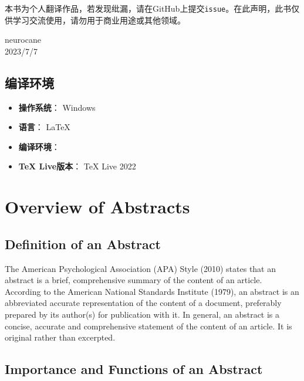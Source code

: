 \documentclass{ctexbook}
\begin{document}
本书为个人翻译作品，若发现纰漏，请在GitHub上提交\verb|issue|。在此声明，此书仅供学习交流使用，请勿用于商业用途或其他领域。

\vfill

\begin{flushright}
    neurocane\\
    2023/7/7
\end{flushright}

\newpage

\section*{编译环境}

\begin{itemize}
    \item \textbf{操作系统}： Windows
    \item \textbf{语言}： \LaTeX
    \item \textbf{编译环境}： \XeLaTeX
    \item \textbf{TeX Live版本}： TeX Live 2022
\end{itemize}

\tableofcontents

\mainmatter


\chapter{Overview of Abstracts}
\section{Definition of an Abstract}

The American Psychological Association (APA) Style (2010) states that an abstract is a brief, comprehensive summary of the content of an article. According to the American National Standards Institute (1979), an abstract is an abbreviated accurate representation of the content of a document, preferably prepared by its author(s) for publication with it. In general, an abstract is a concise, accurate and comprehensive statement of the content of an article. It is original rather than excerpted.

\section{Importance and Functions of an Abstract}
\end{document}
